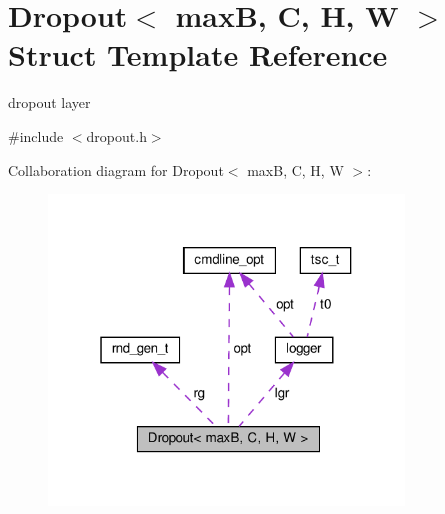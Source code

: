 \hypertarget{structDropout}{}\section{Dropout$<$ maxB, C, H, W $>$ Struct Template Reference}
\label{structDropout}


dropout layer  




{\ttfamily \#include $<$dropout.\+h$>$}



Collaboration diagram for Dropout$<$ maxB, C, H, W $>$\+:
\nopagebreak
\begin{figure}[H]
\begin{center}
\leavevmode
\includegraphics[width=268pt]{structDropout__coll__graph}
\end{center}
\end{figure}
